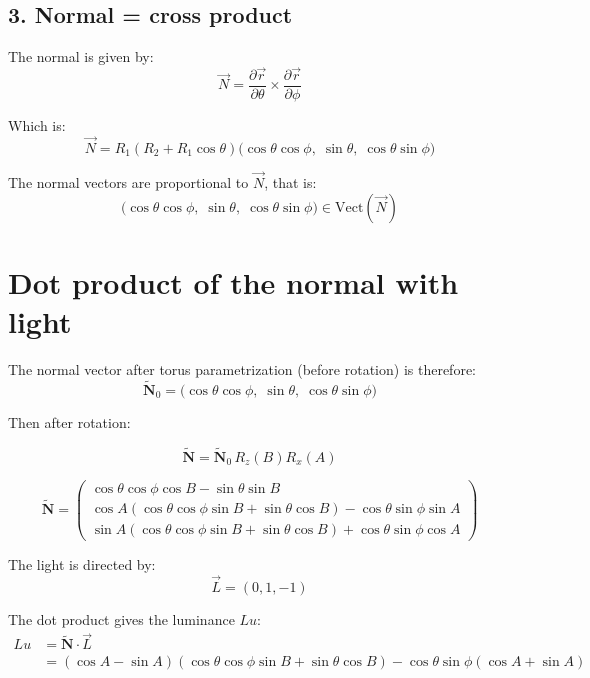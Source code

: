 \documentclass{article}
\begin{document}
\subsection*{3. Normal = cross product}

The normal is given by:
\[
\vec{N} = \frac{\partial \vec{r}}{\partial \theta} \times \frac{\partial \vec{r}}{\partial \phi}
\]


Which is:
\[
\vec{N} = R_1(R_2 + R_1 \cos\theta) 
\big( \cos\theta \cos\phi,\; \sin\theta,\; \cos\theta \sin\phi \big)
\]


The normal vectors are proportional to \(\vec{N}\), that is:
\[
\big( \cos\theta \cos\phi,\; \sin\theta,\; \cos\theta \sin\phi \big) \in \mathrm{Vect}(\vec{N})
\]




\section*{Dot product of the normal with light}


The normal vector after torus parametrization (before rotation) is therefore:
\[
\tilde{\mathbf{N}}_0 = \big( \cos\theta \cos\phi,\; \sin\theta,\; \cos\theta \sin\phi \big)
\]

Then after rotation: 

\[
\tilde{\mathbf{N}} = \tilde{\mathbf{N}}_0 \, R_z(B)R_x(A)
\]


\[
\tilde{\mathbf{N}} =
\begin{pmatrix} 
\cos\theta \cos\phi \cos B - \sin\theta \sin B \\ 
\cos A(\cos\theta \cos\phi \sin B + \sin\theta \cos B) - \cos\theta \sin\phi \sin A \\ 
\sin A(\cos\theta \cos\phi \sin B + \sin\theta \cos B) + \cos\theta \sin\phi \cos A 
\end{pmatrix}
\]

The light is directed by:
\[
\vec{L} = (0, 1, -1)
\]

The dot product gives the luminance \(Lu\):
\[
\begin{aligned}
Lu &= \tilde{\mathbf{N}} \cdot \vec{L} \\
&= (\cos A - \sin A)(\cos\theta \cos\phi \sin B + \sin\theta \cos B) - \cos\theta \sin\phi (\cos A + \sin A)
\end{aligned}
\]
\end{document}

